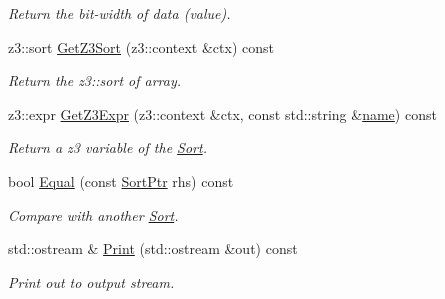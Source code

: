 \begin{DoxyCompactItemize}
\begin{DoxyCompactList}\small\item\em Return the bit-\/width of data (value). \end{DoxyCompactList}\item 
\mbox{\label{classilang_1_1_sort_mem_aeafa419b22faa636d935752429b695af}} 
z3\+::sort \mbox{\hyperlink{classilang_1_1_sort_mem_aeafa419b22faa636d935752429b695af}{Get\+Z3\+Sort}} (z3\+::context \&ctx) const
\begin{DoxyCompactList}\small\item\em Return the z3\+::sort of array. \end{DoxyCompactList}\item 
\mbox{\label{classilang_1_1_sort_mem_ad0aedbc62b13d9d1a2b5decee835896a}} 
z3\+::expr \mbox{\hyperlink{classilang_1_1_sort_mem_ad0aedbc62b13d9d1a2b5decee835896a}{Get\+Z3\+Expr}} (z3\+::context \&ctx, const std\+::string \&\mbox{\hyperlink{classilang_1_1_object_acf20b072e69f572910d7d80c93af0b38}{name}}) const
\begin{DoxyCompactList}\small\item\em Return a z3 variable of the \mbox{\hyperlink{classilang_1_1_sort}{Sort}}. \end{DoxyCompactList}\item 
\mbox{\label{classilang_1_1_sort_mem_afeccd3077def31f67a1d73654f942b63}} 
bool \mbox{\hyperlink{classilang_1_1_sort_mem_afeccd3077def31f67a1d73654f942b63}{Equal}} (const \mbox{\hyperlink{classilang_1_1_sort_a8b9cc5e381404211a1c0423327866d3b}{Sort\+Ptr}} rhs) const
\begin{DoxyCompactList}\small\item\em Compare with another \mbox{\hyperlink{classilang_1_1_sort}{Sort}}. \end{DoxyCompactList}\item 
\mbox{\label{classilang_1_1_sort_mem_aa9398647b9fb47919ffedc34998cb3bc}} 
std\+::ostream \& \mbox{\hyperlink{classilang_1_1_sort_mem_aa9398647b9fb47919ffedc34998cb3bc}{Print}} (std\+::ostream \&out) const
\begin{DoxyCompactList}\small\item\em Print out to output stream. \end{DoxyCompactList}\end{DoxyCompactItemize}

